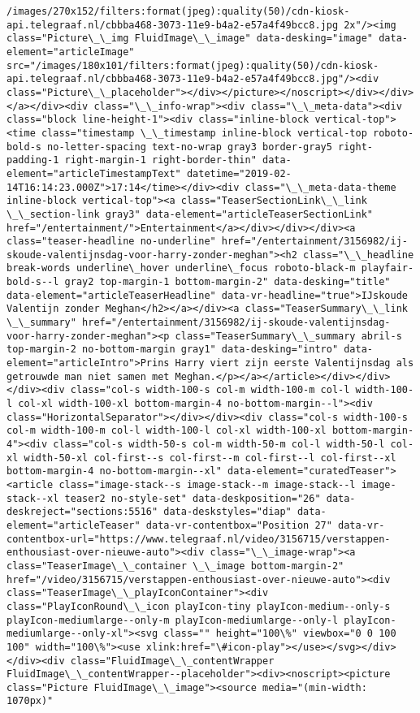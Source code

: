 \documentclass[11pt]{article}
\begin{document}
\begin{Verbatim}[commandchars=\\\{\}]
/images/270x152/filters:format(jpeg):quality(50)/cdn-kiosk-api.telegraaf.nl/cbbba468-3073-11e9-b4a2-e57a4f49bcc8.jpg 2x"/><img class="Picture\_\_img FluidImage\_\_image" data-desking="image" data-element="articleImage" src="/images/180x101/filters:format(jpeg):quality(50)/cdn-kiosk-api.telegraaf.nl/cbbba468-3073-11e9-b4a2-e57a4f49bcc8.jpg"/><div class="Picture\_\_placeholder"></div></picture></noscript></div></div></a></div><div class="\_\_info-wrap"><div class="\_\_meta-data"><div class="block line-height-1"><div class="inline-block vertical-top"><time class="timestamp \_\_timestamp inline-block vertical-top roboto-bold-s no-letter-spacing text-no-wrap gray3 border-gray5 right-padding-1 right-margin-1 right-border-thin" data-element="articleTimestampText" datetime="2019-02-14T16:14:23.000Z">17:14</time></div><div class="\_\_meta-data-theme inline-block vertical-top"><a class="TeaserSectionLink\_\_link \_\_section-link gray3" data-element="articleTeaserSectionLink" href="/entertainment/">Entertainment</a></div></div></div><a class="teaser-headline no-underline" href="/entertainment/3156982/ij-skoude-valentijnsdag-voor-harry-zonder-meghan"><h2 class="\_\_headline break-words underline\_hover underline\_focus roboto-black-m playfair-bold-s--l gray2 top-margin-1 bottom-margin-2" data-desking="title" data-element="articleTeaserHeadline" data-vr-headline="true">IJskoude Valentijn zonder Meghan</h2></a></div><a class="TeaserSummary\_\_link \_\_summary" href="/entertainment/3156982/ij-skoude-valentijnsdag-voor-harry-zonder-meghan"><p class="TeaserSummary\_\_summary abril-s top-margin-2 no-bottom-margin gray1" data-desking="intro" data-element="articleIntro">Prins Harry viert zijn eerste Valentijnsdag als getrouwde man niet samen met Meghan.</p></a></article></div></div></div><div class="col-s width-100-s col-m width-100-m col-l width-100-l col-xl width-100-xl bottom-margin-4 no-bottom-margin--l"><div class="HorizontalSeparator"></div></div><div class="col-s width-100-s col-m width-100-m col-l width-100-l col-xl width-100-xl bottom-margin-4"><div class="col-s width-50-s col-m width-50-m col-l width-50-l col-xl width-50-xl col-first--s col-first--m col-first--l col-first--xl bottom-margin-4 no-bottom-margin--xl" data-element="curatedTeaser"><article class="image-stack--s image-stack--m image-stack--l image-stack--xl teaser2 no-style-set" data-deskposition="26" data-deskreject="sections:5516" data-deskstyles="diap" data-element="articleTeaser" data-vr-contentbox="Position 27" data-vr-contentbox-url="https://www.telegraaf.nl/video/3156715/verstappen-enthousiast-over-nieuwe-auto"><div class="\_\_image-wrap"><a class="TeaserImage\_\_container \_\_image bottom-margin-2" href="/video/3156715/verstappen-enthousiast-over-nieuwe-auto"><div class="TeaserImage\_\_playIconContainer"><div class="PlayIconRound\_\_icon playIcon-tiny playIcon-medium--only-s playIcon-mediumlarge--only-m playIcon-mediumlarge--only-l playIcon-mediumlarge--only-xl"><svg class="" height="100\%" viewbox="0 0 100 100" width="100\%"><use xlink:href="\#icon-play"></use></svg></div></div><div class="FluidImage\_\_contentWrapper FluidImage\_\_contentWrapper--placeholder"><div><noscript><picture class="Picture FluidImage\_\_image"><source media="(min-width: 1070px)" 
\end{Verbatim}
\end{document}
